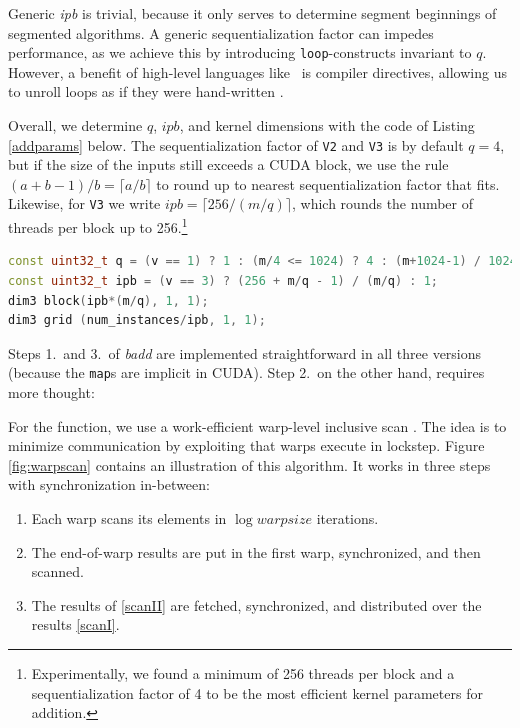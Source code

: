 Generic \textit{ipb} is trivial, because it only serves to determine segment
beginnings of segmented algorithms. A generic sequentialization factor can
impedes performance, as we achieve this by introducing \texttt{loop}-constructs
invariant to $q$. However, a benefit of high-level languages like \cpp\ is
compiler directives, allowing us to unroll loops as if they were hand-written
\cite{cudaguide}.

Overall, we determine $q$, $\mathit{ipb}$, and kernel dimensions with the code
of Listing \ref{addparams} below. The sequentialization factor of \texttt{V2}
and \texttt{V3} is by default $q=4$, but if the size of the inputs still exceeds
a CUDA block, we use the rule $(a + b - 1) / b = \lceil a / b \rceil$ to round up to
nearest sequentialization factor that fits. Likewise, for \texttt{V3} we write
$\mathit{ipb} = \lceil 256 / (m/q) \rceil$, which rounds the number of threads per block
up to 256.\footnote{Experimentally, we found a minimum of 256 threads per block
  and a sequentialization factor of 4 to be the most efficient kernel parameters
  for addition.}


\begin{lstlisting}[language=CPP,caption={\footnotesize CUDA addition parameters and kernel dimensions for version $v$ with size $m$ and $\mathit{num\_instances}$.},label={addparams}]
const uint32_t q = (v == 1) ? 1 : (m/4 <= 1024) ? 4 : (m+1024-1) / 1024;
const uint32_t ipb = (v == 3) ? (256 + m/q - 1) / (m/q) : 1;
dim3 block(ipb*(m/q), 1, 1);
dim3 grid (num_instances/ipb, 1, 1);
\end{lstlisting}

Steps 1.\ and 3.\ of \textit{badd} are implemented straightforward in all three
versions (because the \texttt{map}s are implicit in CUDA). Step 2.\ on the other
hand, requires more thought:

For the  function, we use a work-efficient warp-level inclusive scan
\cite{warpscan}. The idea is to minimize communication by exploiting that warps
execute in lockstep. Figure \ref{fig:warpscan} contains an illustration of this
algorithm. It works in three steps with synchronization in-between:
\begin{enumerate}[label=\Roman*]
\item Each warp scans its elements in $\log \mathit{warpsize}$ iterations.\label{scanI}
\item The end-of-warp results are put in the first warp, synchronized, and then
  scanned.\label{scanII}
\item The results of \ref{scanII} are fetched, synchronized, and distributed over the
  results \ref{scanI}.
\end{enumerate}

